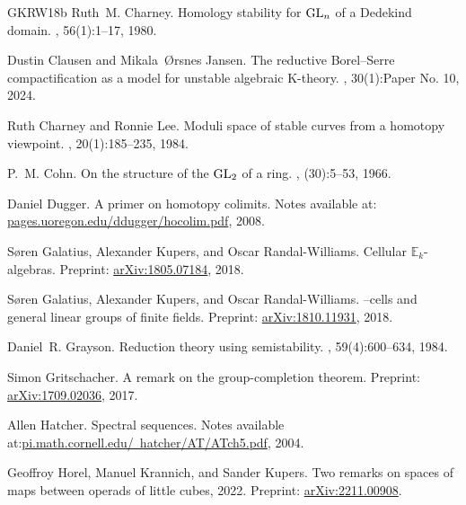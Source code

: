 \documentclass[12pt, reqno]{amsart}
\theoremstyle{plain}
\theoremstyle{definition}
\begin{document}
\begin{thebibliography}{GKRW18b}
Ruth~M. Charney.
\newblock Homology stability for {${\rm GL}\sb{n}$} of a {D}edekind domain.
, 56(1):1--17, 1980.

Dustin Clausen and Mikala~{\O}rsnes Jansen.
\newblock The reductive {B}orel--{S}erre compactification as a model for
  unstable algebraic {K}-theory.
, 30(1):Paper No. 10, 2024.

Ruth Charney and Ronnie Lee.
\newblock Moduli space of stable curves from a homotopy viewpoint.
, 20(1):185--235, 1984.

P.~M. Cohn.
\newblock On the structure of the {${\rm GL}\sb{2}$} of a ring.
, (30):5--53, 1966.

Daniel Dugger.
\newblock A primer on homotopy colimits.
\newblock Notes available at:
  \href{https://pages.uoregon.edu/ddugger/hocolim.pdf}{pages.uoregon.edu/ddugger/hocolim.pdf},
  2008.

S{\o}ren Galatius, Alexander Kupers, and Oscar Randal-Williams.
\newblock Cellular {$\mathbb{E}_k$}-algebras.
\newblock Preprint: \href{https://arxiv.org/abs/1805.07184}{arXiv:1805.07184},
  2018.

S{\o}ren Galatius, Alexander Kupers, and Oscar Randal-Williams.
--cells and general linear groups of finite
  fields.
\newblock Preprint: \href{https://arxiv.org/abs/1810.11931}{arXiv:1810.11931},
  2018.

Daniel~R. Grayson.
\newblock Reduction theory using semistability.
, 59(4):600--634, 1984.

Simon Gritschacher.
\newblock A remark on the group-completion theorem.
\newblock Preprint: \href{https://arxiv.org/abs/1709.02036}{arXiv:1709.02036},
  2017.

Allen Hatcher.
\newblock Spectral sequences.
\newblock Notes available
  at:\href{https://pi.math.cornell.edu/~hatcher/AT/ATch5.pdf}{pi.math.cornell.edu/~hatcher/AT/ATch5.pdf},
  2004.

Geoffroy Horel, Manuel Krannich, and Sander Kupers.
\newblock Two remarks on spaces of maps between operads of little cubes, 2022.
\newblock Preprint: \href{https://arxiv.org/abs/2211.00908}{arXiv:2211.00908}.


\end{thebibliography}
\end{document}
